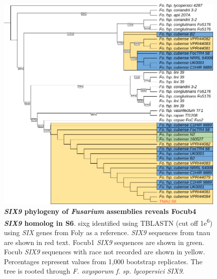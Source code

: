 \begin{figure}[htp!]
  \centering
  \includegraphics[]{Figures/FusSIX9-trimmed.phylo.pdf}
  \caption[\textit{SIX9} phylogeny of \textit{Fusarium} assemblies]{\textbf{\textit{SIX9} phylogeny of \textit{Fusarium} assemblies reveals \acl{Focub4} \textit{SIX9} homolog in S6}. \acl{sixg} identified using TBLASTN (cut off 1\-e\textsuperscript{6}) using \textit{SIX} genes from \acl{Foly} as a reference. \textit{SIX9} sequences from \ac{tnau} are shown in red text. \Acl{Focub1} \textit{SIX9} sequences are shown in green. \acl{Focub} \textit{SIX9} sequences with race not recorded are shown in yellow. Percentages represent values from 1,000 bootstrap replicates. The tree is rooted through \textit{F. oxysporum f. sp. lycopersici} \textit{SIX9}.}
  \label{fig:FusSIX9}
\end{figure}

